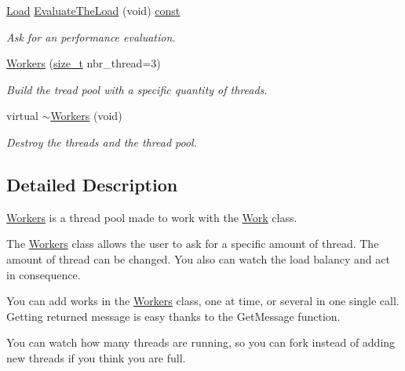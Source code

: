 \begin{DoxyCompactItemize}
\hyperlink{classhbs_1_1_workers_a9bc855eea9a43df727e1a85b3520634f}{Load} \hyperlink{classhbs_1_1_workers_a4445d2fca7108c91d93826d458d39e01}{Evaluate\-The\-Load} (void) \hyperlink{term__entry_8h_a57bd63ce7f9a353488880e3de6692d5a}{const} 
\begin{DoxyCompactList}\small\item\em Ask for an performance evaluation. \end{DoxyCompactList}\item 
\hyperlink{classhbs_1_1_workers_a96d4930cad692e275316de824cab6d35}{Workers} (\hyperlink{nc__alloc_8h_a7b60c5629e55e8ec87a4547dd4abced4}{size\-\_\-t} nbr\-\_\-thread=3)
\begin{DoxyCompactList}\small\item\em Build the tread pool with a specific quantity of threads. \end{DoxyCompactList}\item 
virtual \hyperlink{classhbs_1_1_workers_ad9e1e243123c18d6eb45fbc82b54f07a}{$\sim$\-Workers} (void)
\begin{DoxyCompactList}\small\item\em Destroy the threads and the thread pool. \end{DoxyCompactList}\end{DoxyCompactItemize}


\subsection{Detailed Description}
\hyperlink{classhbs_1_1_workers}{Workers} is a thread pool made to work with the \hyperlink{classhbs_1_1_work}{Work} class. 

The \hyperlink{classhbs_1_1_workers}{Workers} class allows the user to ask for a specific amount of thread. The amount of thread can be changed. You also can watch the load balancy and act in consequence.

You can add works in the \hyperlink{classhbs_1_1_workers}{Workers} class, one at time, or several in one single call. Getting returned message is easy thanks to the Get\-Message function.

You can watch how many threads are running, so you can fork instead of adding new threads if you think you are full. 

